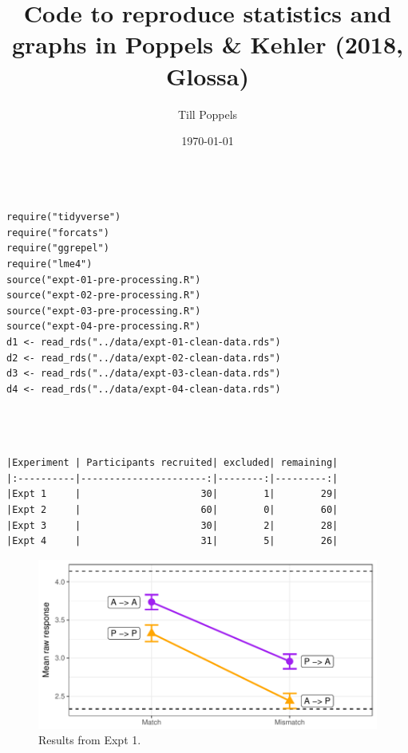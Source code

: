 \documentclass[11pt]{article}
\author{Till Poppels}
\date{\today}
\title{Code to reproduce statistics and graphs in Poppels \& Kehler (2018, Glossa)}
\begin{document}
\maketitle
\tableofcontents

\begin{verbatim}

require("tidyverse")
require("forcats")
require("ggrepel")
require("lme4")
source("expt-01-pre-processing.R")
source("expt-02-pre-processing.R")
source("expt-03-pre-processing.R")
source("expt-04-pre-processing.R")
d1 <- read_rds("../data/expt-01-clean-data.rds")
d2 <- read_rds("../data/expt-02-clean-data.rds")
d3 <- read_rds("../data/expt-03-clean-data.rds")
d4 <- read_rds("../data/expt-04-clean-data.rds")

\end{verbatim}

\begin{verbatim}



|Experiment | Participants recruited| excluded| remaining|
|:----------|----------------------:|--------:|---------:|
|Expt 1     |                     30|        1|        29|
|Expt 2     |                     60|        0|        60|
|Expt 3     |                     30|        2|        28|
|Expt 4     |                     31|        5|        26|
\end{verbatim}



\begin{figure}[htbp]
\centering
\includegraphics[width=.9\linewidth]{img/expt-01-graph.pdf}
\caption{Results from Expt 1.}
\end{figure}
\end{document}
